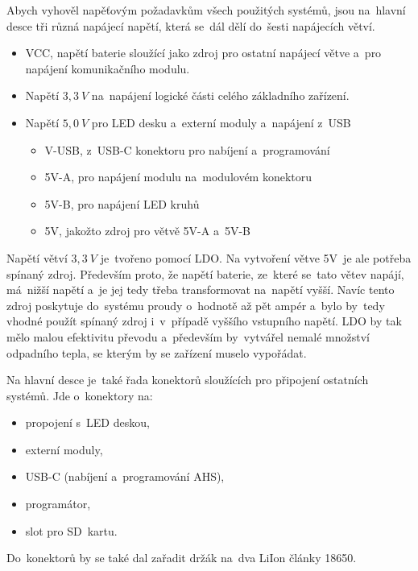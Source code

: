Abych vyhověl napěťovým požadavkům všech použitých systémů, jsou na~hlavní desce tři různá napájecí napětí, která se~dál dělí do~šesti napájecích větví.
\begin{itemize}
    \item VCC, napětí baterie sloužící jako zdroj pro ostatní napájecí větve a~pro napájení komunikačního modulu. 
    \item Napětí \(3,3~V\) na~napájení logické části celého základního zařízení.
    \item Napětí \(5,0~V\) pro LED desku a~externí moduly a~napájení z~USB
    \begin{itemize}
        \item V-USB, z~USB-C konektoru pro nabíjení a~programování
        \item 5V-A, pro napájení modulu na~modulovém konektoru
        \item 5V-B, pro napájení LED kruhů
        \item 5V, jakožto zdroj pro větvě 5V-A a~5V-B 
    \end{itemize}
\end{itemize}
Napětí větví \(3,3~V\) je~tvořeno pomocí LDO.
Na vytvoření větve 5V~je ale potřeba spínaný zdroj.
Především proto, že napětí baterie, ze~které se~tato větev napájí, má~nižší napětí a~je jej tedy třeba transformovat na~napětí vyšší.
Navíc tento zdroj poskytuje do~systému proudy o~hodnotě až pět ampér a~bylo by~tedy vhodné použít spínaný zdroj i~v~případě vyššího vstupního napětí.
LDO by tak mělo malou efektivitu převodu a~především by~vytvářel nemalé množství odpadního tepla, se kterým by se zařízení muselo vypořádat.

Na hlavní desce je~také řada konektorů sloužících pro připojení ostatních systémů.
Jde o~konektory na:
\begin{itemize}
    \item propojení s~LED deskou,                %
    \item externí moduly,                        %
    \item USB-C (nabíjení a~programování AHS),   %
    \item programátor,                           %
    \item slot pro SD~kartu.
\end{itemize}
Do~konektorů by se také dal zařadit držák na~dva LiIon články 18650.

